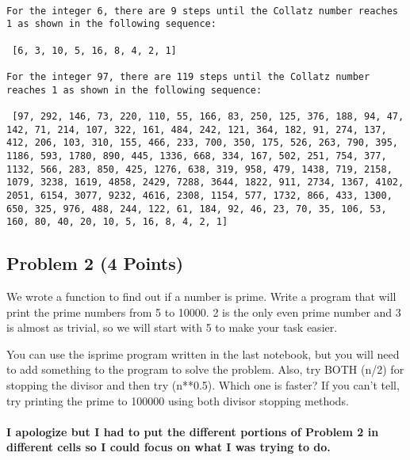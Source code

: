 \documentclass[11pt]{article}
\begin{document}
    \begin{Verbatim}[commandchars=\\\{\}]

For the integer 6, there are 9 steps until the Collatz number reaches 1 as shown in the following sequence:

 [6, 3, 10, 5, 16, 8, 4, 2, 1]

For the integer 97, there are 119 steps until the Collatz number reaches 1 as shown in the following sequence:

 [97, 292, 146, 73, 220, 110, 55, 166, 83, 250, 125, 376, 188, 94, 47, 142, 71, 214, 107, 322, 161, 484, 242, 121, 364, 182, 91, 274, 137, 412, 206, 103, 310, 155, 466, 233, 700, 350, 175, 526, 263, 790, 395, 1186, 593, 1780, 890, 445, 1336, 668, 334, 167, 502, 251, 754, 377, 1132, 566, 283, 850, 425, 1276, 638, 319, 958, 479, 1438, 719, 2158, 1079, 3238, 1619, 4858, 2429, 7288, 3644, 1822, 911, 2734, 1367, 4102, 2051, 6154, 3077, 9232, 4616, 2308, 1154, 577, 1732, 866, 433, 1300, 650, 325, 976, 488, 244, 122, 61, 184, 92, 46, 23, 70, 35, 106, 53, 160, 80, 40, 20, 10, 5, 16, 8, 4, 2, 1]

    \end{Verbatim}

    \hypertarget{problem-2-4-points}{%
\subsection{Problem 2 (4 Points)}\label{problem-2-4-points}}

We wrote a function to find out if a number is prime. Write a program
that will print the prime numbers from 5 to 10000. 2 is the only even
prime number and 3 is almost as trivial, so we will start with 5 to make
your task easier.

You can use the isprime program written in the last notebook, but you
will need to add something to the program to solve the problem. Also,
try BOTH (n/2) for stopping the divisor and then try (n**0.5). Which one
is faster? If you can't tell, try printing the prime to 100000 using
both divisor stopping methods.

    \hypertarget{i-apologize-but-i-had-to-put-the-different-portions-of-problem-2-in-different-cells-so-i-could-focus-on-what-i-was-trying-to-do.}{%
\paragraph{I apologize but I had to put the different portions of
Problem 2 in different cells so I could focus on what I was trying to
do.}\label{i-apologize-but-i-had-to-put-the-different-portions-of-problem-2-in-different-cells-so-i-could-focus-on-what-i-was-trying-to-do.}}
\end{document}
